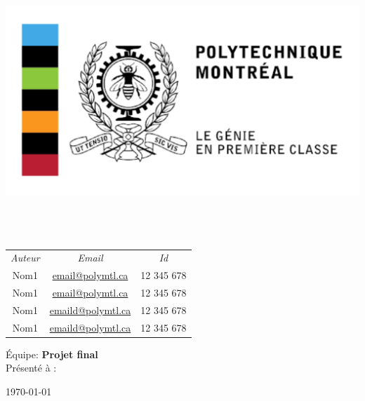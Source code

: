 \begin{titlepage}
\begin{center}

\includegraphics[scale=0.2]{img/logo.png}\\
\textsc{\normalsize\faculte}\\[1.2cm]

\HRule\\[0.4cm]
{\huge\bfseries\doctitle}
\HRule\\[1.5cm]


\begin{tabulary}{\textwidth}{C C C}
  \large\emph{Auteur} & 
  \large\emph{Email} &
  \large\emph{Id} \\
  Nom1 & \href{mailto:email@polymtl.ca}{email@polymtl.ca} & 12 345 678  \\
  Nom1 & \href{mailto:email@polymtl.ca}{email@polymtl.ca} & 12 345 678  \\
  Nom1 & \href{mailto:email@polymtl.ca}{emaild@polymtl.ca} & 12 345 678  \\
  Nom1 & \href{mailto:email@polymtl.ca}{emaild@polymtl.ca} & 12 345 678 \\
\end{tabulary}


\vspace{1.0cm}
{\Large Équipe:  } 
\vfill
{\Large \textbf{Projet final} \\}
\vfill
Présenté à :\\
\institution

\vfill

{\large \today}

\end{center}
\end{titlepage}